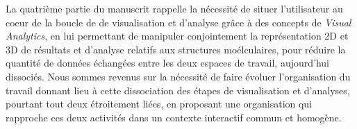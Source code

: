 


La quatrième partie du manuscrit rappelle la nécessité de situer l'utilisateur au coeur de la boucle de de visualisation et d'analyse grâce à des concepts de \textit{Visual Analytics}, en lui permettant de manipuler conjointement la représentation 2D et 3D de résultats et d'analyse relatifs aux structures moélculaires, pour réduire la quantité de données échangées entre les deux espaces de travail, aujourd'hui dissociés. Nous sommes revenus sur la nécessité de faire évoluer l'organisation du travail donnant lieu à cette dissociation des étapes de visualisation et d'analyses, pourtant tout deux étroitement liées, en proposant une organisation qui rapproche ces deux activités dans un contexte interactif commun et homogène.

